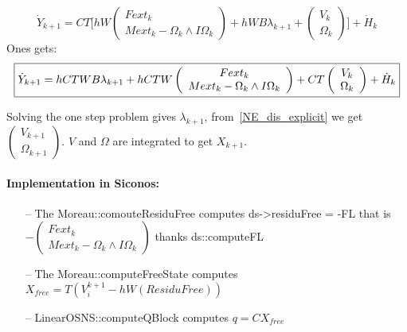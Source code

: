 \[\dot Y _{k+1}= C T \lbrack hW\left(\begin{array}{c} Fext_k\\ Mext_k - \Omega _k \wedge I\Omega _k \end{array}\right)+
   hWB \lambda _{k+1}+
   \left(\begin{array}{c} V_{k} \\ \Omega _{k}\end{array}\right) \rbrack
   + \dot H _{k} \]
Ones gets:
\[\fbox{$
\dot Y _{k+1}= hC T W B \lambda _{k+1} +hCTW \left(\begin{array}{c} Fext_k\\ Mext_k - \Omega _k
   \wedge I\Omega _k \end{array}\right) + CT \left(\begin{array}{c} V_{k} \\ \Omega
   _{k}\end{array}\right) +\dot H _{k} $}\]


Solving the one step problem gives $\lambda _{k+1}$, from~\ref{NE_dis_explicit} we get
$ \left(\begin{array}{l} V_{k+1} \\ \Omega _{k+1} \end{array}\right) $. $V$ and $\Omega$ are integrated
to get $X_{k+1}$.

\paragraph{Implementation in Siconos:}
\begin{enumerate}
  \item[--] The Moreau::comouteResiduFree computes ds->residuFree = -FL that is
  $-\left(\begin{array}{c} Fext_k\\ Mext_k - \Omega _k \wedge I\Omega _k \end{array}\right) $ thanks
  ds::computeFL
  \item[--] The Moreau::computeFreeState computes $X_{free} = T(V_i^{k+1} - hW (ResiduFree))$
    \item[--] LinearOSNS::computeQBlock computes $q=C X_{free}$
  \end{enumerate}

